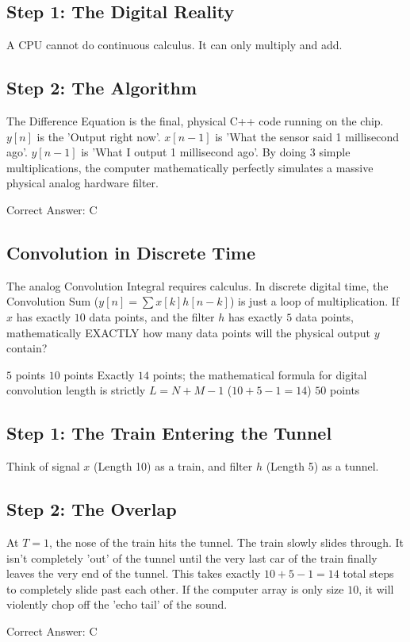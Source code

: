 \begin{solution}

\subsection*{Step 1: The Digital Reality}
A CPU cannot do continuous calculus. It can only multiply and add.

\subsection*{Step 2: The Algorithm}
The Difference Equation is the final, physical C++ code running on the chip. $y[n]$ is the 'Output right now'. $x[n-1]$ is 'What the sensor said 1 millisecond ago'. $y[n-1]$ is 'What I output 1 millisecond ago'. By doing $3$ simple multiplications, the computer mathematically perfectly simulates a massive physical analog hardware filter.

Correct Answer: C
\end{solution}

\clearpage

\subsection{Convolution in Discrete Time}

The analog Convolution Integral requires calculus. In discrete digital time, the Convolution Sum ($y[n] = \sum x[k]h[n-k]$) is just a loop of multiplication. If $x$ has exactly $10$ data points, and the filter $h$ has exactly $5$ data points, mathematically EXACTLY how many data points will the physical output $y$ contain?

\begin{choices}
    \choice $5$ points
    \choice $10$ points
    \correctchoice Exactly $14$ points; the mathematical formula for digital convolution length is strictly $L = N + M - 1$ ($10 + 5 - 1 = 14$)
    \choice $50$ points
\end{choices}

\begin{solution}

\subsection*{Step 1: The Train Entering the Tunnel}
Think of signal $x$ (Length 10) as a train, and filter $h$ (Length 5) as a tunnel.

\subsection*{Step 2: The Overlap}
At $T=1$, the nose of the train hits the tunnel. The train slowly slides through. It isn't completely 'out' of the tunnel until the very last car of the train finally leaves the very end of the tunnel. This takes exactly $10 + 5 - 1 = 14$ total steps to completely slide past each other. If the computer array is only size $10$, it will violently chop off the 'echo tail' of the sound.

Correct Answer: C
\end{solution}

